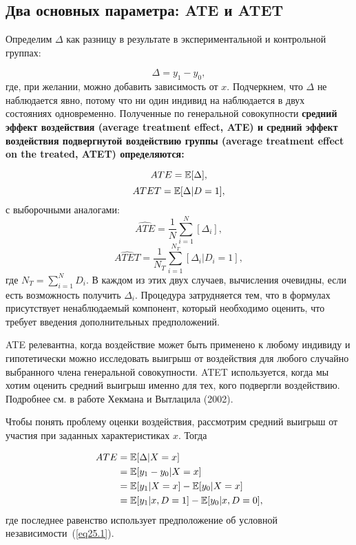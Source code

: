 \subsection{Два основных параметра: ATE и ATET}

Определим $\Delta$ как разницу в результате в экспериментальной и контрольной группах:

\begin{equation}
\label{eq25.13}
\Delta = y_1 - y_0,
\end{equation}
где, при желании, можно добавить зависимость от $x$. Подчеркнем, что $\Delta$ не наблюдается явно, потому что ни один индивид на наблюдается в двух состояниях одновременно. Полученные по генеральной совокупности \bfseries средний эффект воздействия (average treatment effect, ATE)  \mdseries и \bfseries средний эффект воздействия подвергнутой воздействию группы (average treatment effect on the treated, ATET) \mdseries определяются:

\begin{equation}
\label{eq25.14}
ATE = \mathbb{E}[\Delta],
\end{equation}
\begin{equation}
\label{eq25.15}
ATET = \mathbb{E} [\Delta | D = 1],
\end{equation}
с выборочными аналогами:
\begin{equation}
\label{eq25.16}
\widehat{ATE} = \frac{1}{N} \sum_{i=1}^N [\Delta_i],
\end{equation}
\begin{equation}
\label{eq25.17}
\widehat{ATET} = \frac{1}{N_T} \sum_{i=1}^{N_T} [\Delta_i | D_i = 1],
\end{equation}
где $N_T = \sum_{i=1}^N D_i$. В каждом из этих двух случаев, вычисления очевидны, если есть возможность получить $\Delta_i$. Процедура затрудняется тем, что в формулах присутствует ненаблюдаемый компонент, который необходимо оценить, что требует введения дополнительных предположений. 

ATE релевантна, когда воздействие может быть применено к любому индивиду и гипотетически можно исследовать выигрыш от воздействия для любого случайно выбранного члена генеральной совокупности. ATET используется, когда мы хотим оценить средний выигрыш именно для тех, кого подвергли воздействию. Подробнее см. в работе Хекмана и Вытлацила (2002). 

Чтобы понять проблему оценки воздействия, рассмотрим средний выигрыш от участия при заданных характеристиках $x$. Тогда

\begin{align}
\label{eq25.18}
ATE & =  \mathbb{E}[ \Delta | X=x ]  \\
& =  \mathbb{E}[ y_1 - y_0 | X = x ] \nonumber \\
& =  \mathbb{E}[ y_1 | X=x ] - \mathbb{E}[ y_0 | X=x ] \nonumber \\
& =  \mathbb{E}[ y_1 | x, D = 1] - \mathbb{E}[ y_0 | x , D = 0 ], \nonumber
\end{align}
где последнее равенство использует предположение об условной независимости~(\ref{eq25.1}). 

